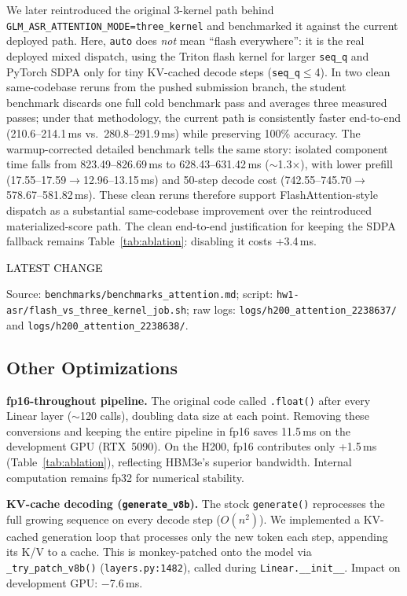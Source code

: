 \documentclass{article}
\newcommand{\latestchglabel}{{\setlength{\fboxsep}{1pt}\colorbox{yellow!65}{\textcolor{black}{\scriptsize LATEST CHANGE}}}}
\newcommand{\latestchgblock}[1]{%
  \begingroup
  \setlength{\fboxsep}{4pt}%
  \colorbox{yellow!20}{%
    \parbox{\dimexpr\linewidth-2\fboxsep\relax}{#1}%
  }%
  \endgroup
}
\newcommand{\latestsource}[1]{%
  \par\noindent
  {\footnotesize \latestchglabel\ \parbox[t]{0.9\linewidth}{#1}}\par
}
\begin{document}
\latestchgblock{We later reintroduced the original 3-kernel path behind \texttt{GLM\_ASR\_ATTENTION\_MODE=three\_kernel} and benchmarked it against the current deployed path.  Here, \texttt{auto} does \emph{not} mean ``flash everywhere'': it is the real deployed mixed dispatch, using the Triton flash kernel for larger \texttt{seq\_q} and PyTorch SDPA only for tiny KV-cached decode steps (\texttt{seq\_q}$\leq$4).  In two clean same-codebase reruns from the pushed submission branch, the student benchmark discards one full cold benchmark pass and averages three measured passes; under that methodology, the current path is consistently faster end-to-end (210.6--214.1\,ms vs.\ 280.8--291.9\,ms) while preserving 100\% accuracy.  The warmup-corrected detailed benchmark tells the same story: isolated component time falls from 823.49--826.69\,ms to 628.43--631.42\,ms ($\sim$1.3$\times$), with lower prefill (17.55--17.59$\rightarrow$12.96--13.15\,ms) and 50-step decode cost (742.55--745.70$\rightarrow$578.67--581.82\,ms).  These clean reruns therefore support FlashAttention-style dispatch as a substantial same-codebase improvement over the reintroduced materialized-score path.  The clean end-to-end justification for keeping the SDPA fallback remains Table~\ref{tab:ablation}: disabling it costs +3.4\,ms.}

\latestsource{Source: \texttt{benchmarks/benchmarks\_attention.md}; script: \texttt{hw1-asr/flash\_vs\_three\_kernel\_job.sh}; raw logs: \texttt{logs/h200\_attention\_2238637/} and \texttt{logs/h200\_attention\_2238638/}.}

\subsection{Other Optimizations}

\textbf{fp16-throughout pipeline.}
The original code called \texttt{.float()} after every Linear layer ($\sim$120 calls), doubling data size at each point.  Removing these conversions and keeping the entire pipeline in fp16 saves 11.5\,ms on the development GPU (RTX~5090).  On the H200, fp16 contributes only +1.5\,ms (Table~\ref{tab:ablation}), reflecting HBM3e's superior bandwidth.  Internal computation remains fp32 for numerical stability.

\textbf{KV-cache decoding (\texttt{generate\_v8b}).}
The stock \texttt{generate()} reprocesses the full growing sequence on every decode step ($O(n^2)$).  We implemented a KV-cached generation loop that processes only the new token each step, appending its K/V to a cache.  This is monkey-patched onto the model via \texttt{\_try\_patch\_v8b()} (\texttt{layers.py:1482}), called during \texttt{Linear.\_\_init\_\_}.  Impact on development GPU: $-$7.6\,ms.
\end{document}
